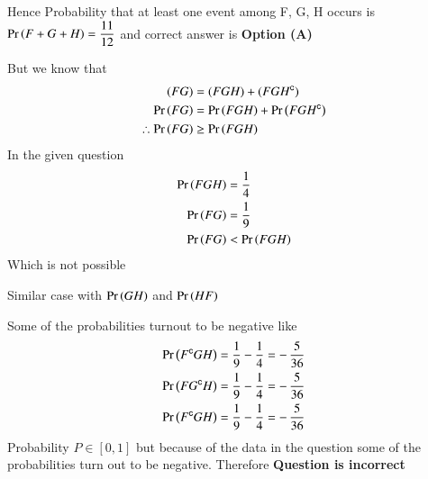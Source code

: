 \documentclass[journal,12pt,twocolumn]{IEEEtran}
\begin{document}
Hence Probability that at least one event among F, G, H occurs is $\Pr\left(F + G + H\right)=\dfrac{11}{12}$ and correct answer is \textbf{Option (A)}
\null \par \null
But we know that 
\begin{align}
(F G) &= (F G H) + (F G H^{\mathsf{c}}) \\
\Pr\left(F G\right) &= \Pr\left(F G H\right) + \Pr\left(F G H^{\mathsf{c}}\right) \\
\therefore \Pr\left(F G\right) &\geq \Pr\left(F G H\right) 
\end{align}
In the given question 
\begin{align}
\Pr\left(F G H\right) &= \dfrac{1}{4} \\
\Pr\left(F G\right)   &= \dfrac{1}{9} \\
\Pr\left(F G \right) &< \Pr\left(F G H\right)
\end{align}
Which is not possible

Similar case with $\Pr\left(G H\right)$ and $\Pr\left(H F\right)$ 

Some of the probabilities turnout to be negative like 
\begin{align}
\Pr\left(F^{\mathsf{c}} G H\right)  &= \dfrac{1}{9} - \dfrac{1}{4} = -\,\dfrac{5}{36} \\
\Pr\left(F G^{\mathsf{c}} H\right)  &= \dfrac{1}{9} - \dfrac{1}{4} = -\,\dfrac{5}{36} \\
\Pr\left(F^{\mathsf{c}} G H\right)  &= \dfrac{1}{9} - \dfrac{1}{4} = -\,\dfrac{5}{36} 
\end{align}
Probability $P\in [0,1]$ but because of the data in the question some of the probabilities turn out to be negative. Therefore \textbf{Question is incorrect}
\end{document}
